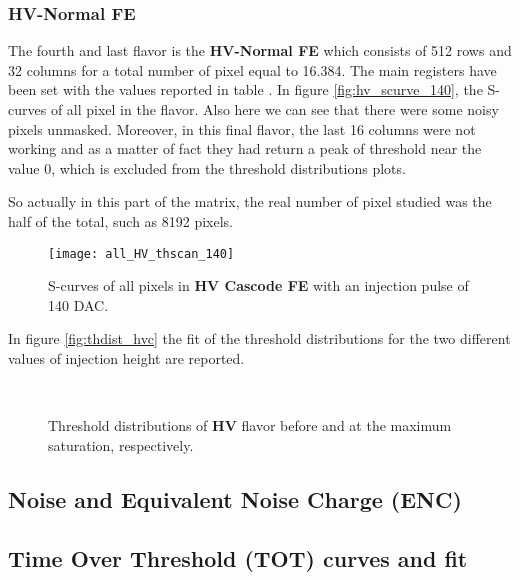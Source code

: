 \subsubsection{HV-Normal FE}

The fourth and last flavor is the \textbf{HV-Normal FE} which consists of 512 rows and 32 columns for a total number of pixel equal to 16.384. The main registers have been set with the values reported in table .
In figure \vref{fig:hv_scurve_140}, the S-curves of all pixel in the flavor. Also here we can see that there were some noisy pixels unmasked.
Moreover, in this final flavor, the last 16 columns were not working and as a matter of fact they had return a peak of threshold near the value 0, which is excluded from the threshold distributions plots.

So actually in this part of the matrix, the real number of pixel studied was the half of the total, such as 8192 pixels.



\begin{figure}[h!]
\centering
\texttt{[image: all\_HV\_thscan\_140]}
\caption{S-curves of all pixels in \textbf{HV Cascode FE} with an injection pulse of 140 DAC.}
\label{fig:hv_scurve_140}
\end{figure}

In figure \vref{fig:thdist_hvc} the fit of the threshold distributions for the two different values of injection height are reported.


\begin{figure}[h!]
\centering
{}\quad
{}\\
\caption{Threshold distributions of \textbf{HV} flavor before and at the maximum saturation, respectively.}
\label{fig:thdist_hvc}
\end{figure}



\subsection{Noise and Equivalent Noise Charge (ENC)}

\subsection{Time Over Threshold (TOT) curves and fit}


